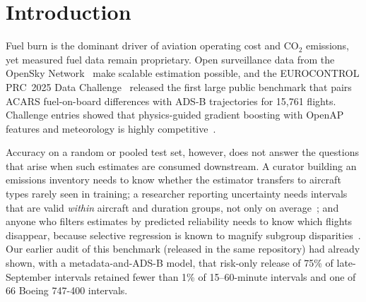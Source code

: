 \documentclass[runningheads]{llncs}
\begin{document}
\begin{abstract}
At a fixed 75\% release rate, guaranteeing 50\% release in every duration bin and frequent aircraft type raises the share of labelled fuel represented from \fuelShareHgbResidualPhysicsRiskOnly{}\% to \fuelShareHgbResidualPhysicsRepresentationFloor{}\% at a cost of \floorCostHgbResidualPhysics{}\,kg accepted MAE.
All code, configuration hashes and result files are released; the study is a forward temporal evaluation on development-era data and not an external validation.
\end{abstract}

\section{Introduction}
Fuel burn is the dominant driver of aviation operating cost and CO$_2$ emissions, yet measured fuel data remain proprietary. Open surveillance data from the OpenSky Network~\cite{schafer2014opensky} make scalable estimation possible, and the EUROCONTROL PRC~2025 Data Challenge~\cite{sun2026prc,zenodo_prc2025} released the first large public benchmark that pairs ACARS fuel-on-board differences with ADS-B trajectories for 15,761 flights.
Challenge entries showed that physics-guided gradient boosting with OpenAP~\cite{sun2020openap} features and meteorology is highly competitive~\cite{grigoriou2026physics,kacar2026weather}.

Accuracy on a random or pooled test set, however, does not answer the questions that arise when such estimates are consumed downstream. A curator building an emissions inventory needs to know whether the estimator transfers to aircraft types rarely seen in training; a researcher reporting uncertainty needs intervals that are valid \emph{within} aircraft and duration groups, not only on average~\cite{vovk2012mondrian,gibbs2023conditional}; and anyone who filters estimates by predicted reliability needs to know which flights disappear, because selective regression is known to magnify subgroup disparities~\cite{shah2022selective}.
Our earlier audit of this benchmark (released in the same repository) had already shown, with a metadata-and-ADS-B model, that risk-only release of 75\% of late-September intervals retained fewer than 1\% of 15--60-minute intervals and one of 66 Boeing 747-400 intervals.
\end{document}
